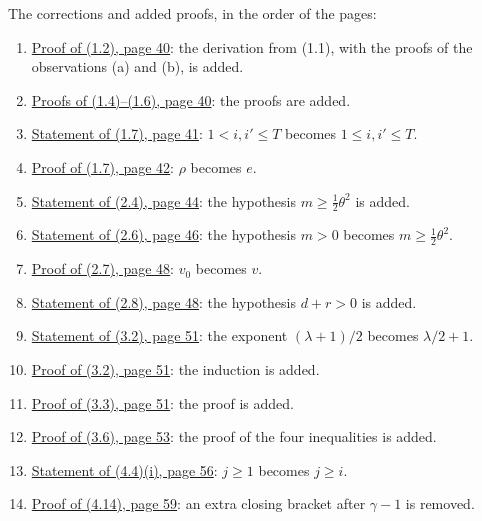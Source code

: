 The corrections and added proofs, in the order of the pages:
\begin{enumerate}\setlength{\itemsep}{1pt}
\item {}\hyperref[fix:1.2-proof-added]{Proof of (1.2), page 40}: the derivation from (1.1), with the proofs of the observations (a) and (b), is added.
\item {}\hyperref[fix:1.4-1.6-proof-added]{Proofs of (1.4)--(1.6), page 40}: the proofs are added.
\item {}\hyperref[fix:1.7]{Statement of (1.7), page 41}: $1<i,i'\le T$ becomes $1\le i,i'\le T$.
\item {}\hyperref[fix:1.7-proof]{Proof of (1.7), page 42}: $\rho$ becomes $e$.
\item {}\hyperref[fix:2.4]{Statement of (2.4), page 44}: the hypothesis $m\ge\frac12\theta^2$ is
added.
\item {}\hyperref[fix:2.6]{Statement of (2.6), page 46}: the hypothesis $m>0$ becomes
$m\ge\frac12\theta^2$.
\item {}\hyperref[fix:2.7-proof]{Proof of (2.7), page 48}: $v_0$ becomes $v$.
\item {}\hyperref[fix:2.8]{Statement of (2.8), page 48}: the hypothesis $d+r>0$ is added.
\item {}\hyperref[fix:3.2]{Statement of (3.2), page 51}: the exponent $(\lambda+1)/2$ becomes
$\lambda/2+1$.
\item {}\hyperref[fix:3.2-proof-added]{Proof of (3.2), page 51}: the induction is added.
\item {}\hyperref[fix:3.3-proof-added]{Proof of (3.3), page 51}: the proof is added.
\item {}\hyperref[fix:3.6-proof-added]{Proof of (3.6), page 53}: the proof of the four inequalities is added.
\item {}\hyperref[fix:4.4]{Statement of (4.4)(i), page 56}: $j\ge 1$ becomes $j\ge i$.
\item {}\hyperref[fix:4.14]{Proof of (4.14), page 59}: an extra closing bracket after
$\gamma-1$ is removed.
\end{enumerate}
